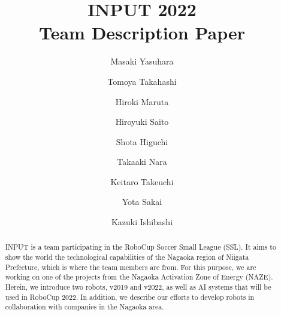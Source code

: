 \documentclass[]{llncs}
\begin{document}
%
\title{INPUT 2022\\ Team Description Paper}
%
%
\author{Masaki Yasuhara \and Tomoya Takahashi 
\and Hiroki Maruta \and Hiroyuki Saito \and Shota Higuchi 
\and Takaaki Nara \and Keitaro Takeuchi \and Yota Sakai \and Kazuki Ishibashi}
%
%
%
\maketitle              %



\begin{abstract}
INPUT is a team participating in the RoboCup Soccer Small League (SSL). 
%
It aims to show the world the technological capabilities of the Nagaoka region of Niigata Prefecture, which is where the team members are from. 
%
For this purpose, we are working on one of the projects from the Nagaoka Activation Zone of Energy (NAZE). 
%
Herein, we introduce two robots, v2019 and v2022, as well as AI systems that will be used in RoboCup 2022.
%
In addition, we describe our efforts to develop robots in collaboration with companies in the Nagaoka area. 
%
\end{abstract}
\end{document}

